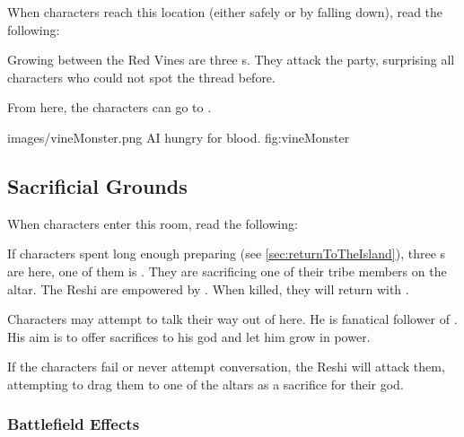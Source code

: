 When characters reach this location (either safely or by falling down), read the following:


Growing between the Red Vines are three \enemyVineMonster{}s. They attack the party, surprising all characters who could not spot the thread before.

From here, the characters can go to .

					{images/vineMonster.png}
					{AI}
					{\enemyVineMonsterName{} hungry for blood.}
					{fig:vineMonster}


\subsection{Sacrificial Grounds}
\label{ssec:dungeonSacrifices}

When characters enter this room, read the following:


If characters spent long enough preparing (see \ref{sec:returnToTheIsland}), three \enemyReshiWarrior{}s are here, one of them is \npcReshiPriest{}. They are sacrificing one of their tribe members on the altar. The Reshi are empowered by \textbf{\abilityVinesName[2]}. When killed, they will return with \textbf{\abilityHuskName[2]}. 

Characters may attempt to talk their way out of here.
He is fanatical follower of \npcSprenVines{}. His aim is to offer sacrifices to his god and let him grow in power.

If the characters fail or never attempt conversation, the Reshi will attack them, attempting to drag them to one of the altars as a sacrifice for their god. 

\subsubsection{Battlefield Effects}

